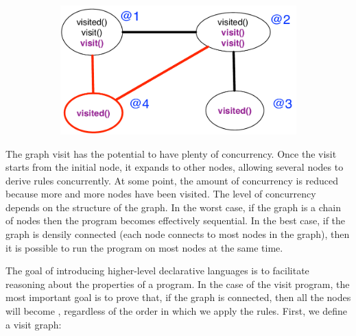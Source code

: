 \begin{figure}[h]
\begin{subfigure}[b]{0.45\textwidth}
                \label{fig:exec_trace3}
        \end{subfigure}%
        ~ %
        \begin{subfigure}[b]{0.45\textwidth}
                  \includegraphics[width=\textwidth]{figures/visit/trace4}


                  \label{fig:exec_trace4}
          \end{subfigure}
        \label{fig:exec_trace}
\end{figure}

The graph visit has the potential to have plenty of concurrency. Once the visit
starts from the initial node, it expands to other nodes, allowing several nodes
to derive rules concurrently. At some point, the amount of concurrency is
reduced because more and more nodes have been visited. The level of concurrency
depends on the structure of the graph. In the worst case, if the graph is a
chain of nodes then the program becomes effectively sequential.  In the best
case, if the graph is densily connected (each node connects to most nodes in the
graph), then it is possible to run the program on most nodes at the same time.

The goal of introducing higher-level declarative languages is to facilitate
reasoning about the properties of a program. In the case of the visit program,
the most important goal is to prove that, if the graph is connected, then all
the nodes will become , regardless of the order in which we apply
the rules. First, we define a visit graph:

